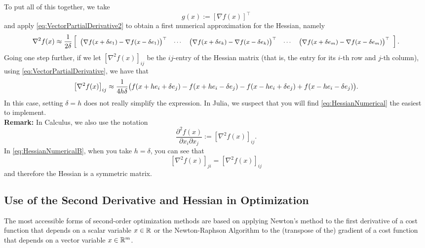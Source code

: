     
To put all of this together, we take
$$g(x):= \left[ \nabla f(x) \right]^\top $$
and apply \eqref{eq:VectorPartialDerivative2} to obtain a first numerical approximation for the Hessian, namely
\begin{equation}
    \label{eq:HessianNumerical} \small
    \nabla^2 f(x) \approx  
\frac{1}{2\delta} \left[\begin{array}{ccccc}
   \big(  \nabla f(x+\delta e_1)-\nabla f(x-\delta e_1)  \big)^\top 
   &  \cdots & \big( \nabla f(x+\delta e_k)-\nabla f(x-\delta e_k) \big)^\top
   & \cdots & \big( \nabla f(x+\delta e_m)-\nabla f(x-\delta e_m) \big)^\top
    \end{array} \right].
\end{equation}
Going one step further, if we let $\left[ \nabla^2 f(x)  \right]_{ij}$ be the $ij$-entry of the Hessian matrix (that is, the entry for its $i$-th row and $j$-th column), using \eqref{eq:VectorPartialDerivative}, we have that
\begin{equation}
    \label{eq:HessianNumericalB} \small
   \left[ \nabla^2 f(x)\right]_{ij} \approx  
\frac{1}{4 h \delta} 
   \big(   f(x+ h e_i + \delta e_j)-  f(x+ h e_i-\delta e_j) - f(x- h e_i + \delta e_j) +  f(x- h e_i-\delta e_j)\big) .
\end{equation}
In this case, setting $\delta=h$ does not really simplify the expression. In Julia, we suspect that you will find \eqref{eq:HessianNumerical} the easiest to implement. \\

\textbf{Remark:} In Calculus, we also use the notation
$$ \frac{\partial^2 f(x)}{\partial x_i \partial x_j} :=\left[ \nabla^2 f(x)\right]_{ij}.  $$
In \eqref{eq:HessianNumericalB}, when you take  $h = \delta$, you can see that $$\left[ \nabla^2 f(x)\right]_{ji} =\left[ \nabla^2 f(x)\right]_{ij}$$
and therefore the Hessian is a symmetric matrix. 

\subsection{Use of the Second Derivative and Hessian in Optimization}
\label{sec:HessianOptimization}

The most accessible forms of second-order optimization methods are based on applying Newton's method to the first derivative of a cost function that depends on a scalar variable $x\in \mathbb R$ or the Newton-Raphson Algorithm to the (transpose of the) gradient of a cost function that depends on a vector variable $x\in \mathbb R^m$. \\


